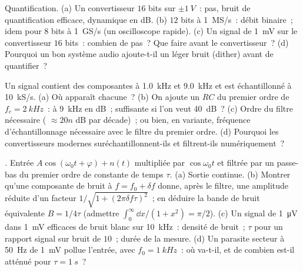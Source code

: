 \begin{exercise}[$\star\star$]\label{exo:b2:feedback-oscillators:8}
Quantification. (a) Un convertisseur $16$ bits sur $\pm\qty{1}{V}$~: pas, bruit
de quantification efficace, dynamique en dB. (b) $12$ bits à
\qty{1}{MS/s}~: débit binaire~; idem pour $8$ bits à \qty{1}{GS/s} (un oscilloscope
rapide). (c) Un signal de \qty{1}{mV} sur le convertisseur $16$ bits~: combien de
pas~? Que faire avant le convertisseur~? (d) Pourquoi un bon système
audio ajoute-t-il un léger bruit (dither) avant de quantifier~?
\end{exercise}

\begin{exercise}[$\star\star$]\label{exo:b2:feedback-oscillators:9}
Un signal contient des composantes à \qty{1.0}{kHz} et \qty{9.0}{kHz} et est
échantillonné à \qty{10}{kS/s}. (a) Où apparaît chacune~? (b) On ajoute un
 $RC$ du premier ordre de $f_c = \qty{2}{kHz}$~:
 à \qty{9}{kHz} en dB~; suffisante si l'on veut \qty{40}{dB}~? (c)
Ordre du filtre nécessaire ( $\approx 20n$ dB par décade)~; ou bien,
en variante, fréquence d'échantillonnage nécessaire avec le filtre du premier ordre. (d)
Pourquoi les convertisseurs modernes suréchantillonnent-ils et filtrent-ils numériquement~?
\end{exercise}

\begin{exercise}[$\star\star\star$]\label{exo:b2:feedback-oscillators:10}
\emph{.} Entrée $A\cos(\omega_0t + \varphi) + n(t)$ multipliée par $\cos\omega_0t$
et filtrée par un passe-bas du premier ordre de constante de temps $\tau$. (a) Sortie
continue. (b) Montrer qu'une composante de bruit à $f = f_0 + \delta f$ donne, après
le filtre, une amplitude réduite d'un facteur $1/\sqrt{1 + (2\pi\delta f\tau)^2}$~;
en déduire la bande de bruit équivalente $B = 1/4\tau$ (admettre $\int_0^\infty
\dd x/(1 + x^2) = \pi/2$). (c) Un signal de \qty{1}{\micro V} dans \qty{1}{mV} efficaces de
bruit blanc sur \qty{10}{kHz}~: densité de bruit~; $\tau$ pour un rapport signal sur
bruit de $10$~; durée de la mesure. (d) Un parasite secteur à \qty{50}{Hz} de \qty{1}{mV}
pollue l'entrée, avec $f_0 = \qty{1}{kHz}$~: où va-t-il, et de
combien est-il atténué pour $\tau = \qty{1}{s}$~?
\end{exercise}

